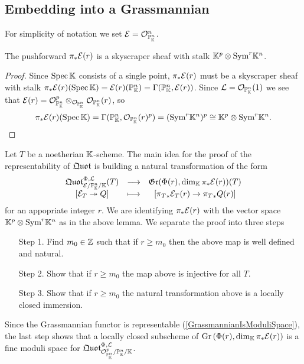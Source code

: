 \subsection{Embedding into a Grassmannian}
For simplicity of notation we set $\mathcal{E}=\mathcal{O}^n_{\mathbb{P}^n_{\mathbb{K}}}$. 
\begin{lemma}\label{PushforwardEr}
The pushforward
$\pi_\ast\mathcal{E}(r)$ is a skyscraper sheaf with stalk $\mathbb{K}^p\otimes \mathrm{Sym}^r\mathbb{K}^n$.
\end{lemma}
\begin{proof}
Since $\mathrm{Spec}\,\mathbb{K}$ consists of a single point, $\pi_\ast\mathcal{E}(r)$ must be a skyscraper sheaf with stalk $\pi_\ast\mathcal{E}(r)(\mathrm{Spec}\,\mathbb{K})=\mathcal{E}(r)(\mathbb{P}^n_{\mathbb{K}})=\Gamma(\mathbb{P}^n_{\mathbb{K}},\mathcal{E}(r))$. Since $\mathcal{L}=\mathcal{O}_{\mathbb{P}^n_{\mathbb{K}}}(1)$ we see that $\mathcal{E}(r)=\mathcal{O}_{\mathbb{P}^n_{\mathbb{K}}}^p\otimes_{\mathcal{O}_{\mathbb{P}^n_{\mathbb{K}}}}\mathcal{O}_{\mathbb{P}^n_{\mathbb{K}}}(r)$, so
\[\pi_\ast\mathcal{E}(r)(\mathrm{Spec}\,\mathbb{K})=\Gamma(\mathbb{P}^n_{\mathbb{K}},\mathcal{O}_{\mathbb{P}^n_{\mathbb{K}}}(r)^p)=(\mathrm{Sym}^r\mathbb{K}^n)^p\cong \mathbb{K}^p\otimes\mathrm{Sym}^r\mathbb{K}^n.\]
\end{proof}


Let $T$ be a noetherian $\mathbb{K}$-scheme. The main idea for the proof of the representability of $\mathfrak{Quot}$ is building a natural transformation of the form
\[\begin{array}{ccc} {\mathfrak{Quot}^{\Phi,\mathcal{L}}_{\mathcal{E}/\mathbb{P}^n_{\mathbb{K}}/\mathbb{K}}(T)} & \longrightarrow & {\mathfrak{Gr}(\Phi(r),\dim_{\mathbb{K}}\pi_\ast\mathcal{E}(r))(T)}\\ {[\mathcal{E}_T\twoheadrightarrow Q]} & \longmapsto & {[{\pi_T}_\ast\mathcal{E}_T(r)\to {\pi_T}_\ast Q(r)]} \end{array}\]
for an appopriate integer $r$. We are identifying $\pi_\ast\mathcal{E}(r)$ with the vector space $\mathbb{K}^p\otimes\mathrm{Sym}^r\mathbb{K}^n$ as in the above lemma. We separate the proof into three steps
\setlength{\leftmargini}{0cm}
\begin{enumerate}
\item[Step 1.] Find $m_0\in\mathbb{Z}$ such that if $r\geq m_0$ then the above map is well defined and natural.
\item[Step 2.] Show that if $r\geq m_0$ the map above is injective for all $T$.
\item[Step 3.] Show that if $r\geq m_0$ the natural transformation above is a locally closed immersion.
\end{enumerate}
\setlength{\leftmargini}{0.5cm}
Since the Grassmannian functor is representable (\ref{GrassmannianIsModuliSpace}), the last step shows that a locally closed subscheme of $\mathrm{Gr}\left({\Phi(r), \dim_{\mathbb{K}}\pi_\ast\mathcal{E}(r)}\right)$ is a fine moduli space for $\mathfrak{Quot}^{\Phi,\mathcal{L}}_{\mathcal{O}^p_{\mathbb{P}^n_{\mathbb{K}}}/\mathbb{P}^n_{\mathbb{K}}/\mathbb{K}}$.


